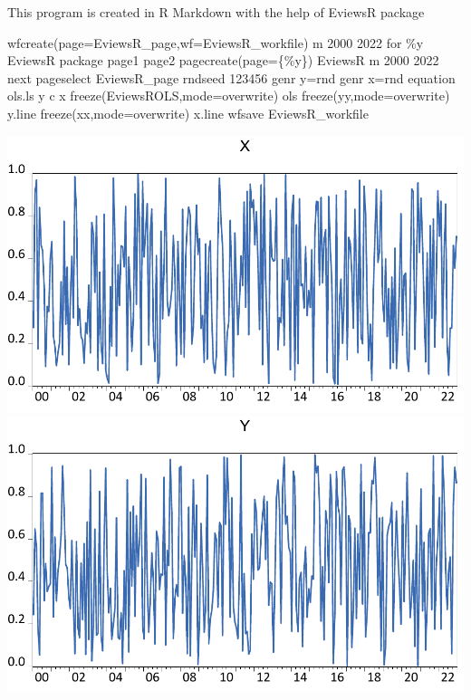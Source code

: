 \documentclass[
]{article}
\newenvironment{Shaded}{\begin{snugshade}}{\end{snugshade}}
\newcommand{\NormalTok}[1]{#1}
\begin{document}
\begin{Shaded}
\begin{Highlighting}[]
\NormalTok{    \textquotesingle{}This program is created in R Markdown with the help of EviewsR package}
  
\NormalTok{  wfcreate(page=EviewsR\_page,wf=EviewsR\_workfile) m 2000 2022}
\NormalTok{  for \%y EviewsR package page1 page2}
\NormalTok{  pagecreate(page=\{\%y\}) EviewsR m 2000 2022}
\NormalTok{  next}
\NormalTok{  pageselect EviewsR\_page}
\NormalTok{  rndseed 123456}
\NormalTok{  genr y=rnd}
\NormalTok{  genr x=rnd}
\NormalTok{  equation ols.ls y c x}
\NormalTok{  freeze(EviewsROLS,mode=overwrite) ols}
\NormalTok{  freeze(yy,mode=overwrite) y.line}
\NormalTok{  freeze(xx,mode=overwrite) x.line}
\NormalTok{  wfsave EviewsR\_workfile}
\end{Highlighting}
\end{Shaded}

\includegraphics{eviewsr-eviewsr_page-xx.pdf} \includegraphics{eviewsr-eviewsr_page-yy.pdf}
\end{document}
